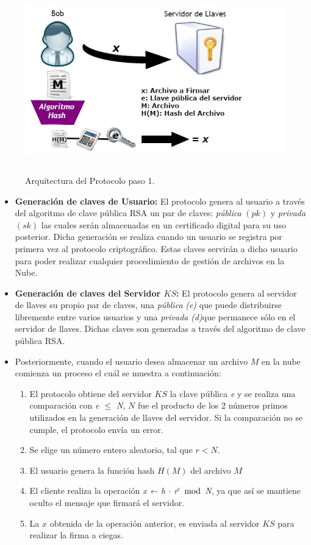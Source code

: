 \begin{figure}[H]
\centering
\includegraphics[width=15cm, height=8cm]{./images/Paso01.jpg}
\caption{Arquitectura del Protocolo paso 1.}

\end{figure}
\begin{itemize}
	\item \textbf{Generación de claves de Usuario: } El protocolo genera al usuario a través del algoritmo de clave pública RSA un par de claves: \textit{pública} $(pk)$ y \textit{privada} $(sk)$ las cuales serán almacenadas en un certificado digital para su uso posterior. Dicha generación se realiza cuando un usuario se registra por primera vez al protocolo criptográfico. Estas claves servirán a dicho usuario para poder realizar cualquier procedimiento de gestión de archivos en la Nube. 
	\item \textbf{Generación de claves del Servidor $KS$: } El protocolo genera al servidor de llaves su propio par de claves, una \textit{pública} \textit{(e)} que puede distribuirse libremente entre varios usuarios y una \textit{privada} \textit{(d)}que permanece sólo en el servidor de llaves. Dichas claves son generadas a través del algoritmo de clave pública RSA. 
	\item Posteriormente, cuando el usuario desea  almacenar un archivo $M$ en la nube comienza un proceso el cuál se muestra a continuación: 
		\begin{enumerate}
			\item El protocolo obtiene del servidor $KS$ la clave pública \textit{e} y se realiza una comparación con \textit{e $\leq$ N}, $N$ fue el producto de los 2 números primos utilizados en la generación de llaves del servidor. Si la comparación no se cumple, el protocolo envía un error.
			\item Se elige un número entero aleatorio, tal que $r<N$.
			\item El usuario genera la función hash $H(M)$ del archivo $M$ 
			\item El cliente realiza la operación \textit{x ← h $\cdot$ r$^e$ $\bmod$ N}, ya que así se mantiene oculto el mensaje que firmará el servidor. 
			\item La $x$ obtenida de la operación anterior, es enviada al servidor $KS$ para realizar la firma a ciegas.
		\end{enumerate}
\end{itemize}


